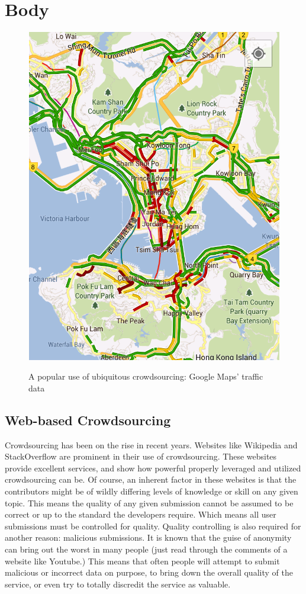 \documentclass{sig-alternate-05-2015}
\begin{document}
	\section{Body}	
	\begin{figure}
		\centering \includegraphics[width=0.7\columnwidth]{maps-traffic}
		\label{fig-traffic}
		\caption{A popular use of ubiquitous crowdsourcing: Google Maps' traffic data}
	\end{figure}
	\subsection{Web-based Crowdsourcing}
	
	Crowdsourcing has been on the rise in recent years. Websites like Wikipedia and StackOverflow are prominent in their use of crowdsourcing. These websites provide excellent services, and show how powerful properly leveraged and utilized crowdsourcing can be. Of course, an inherent factor in these websites is that the contributors might be of wildly differing levels of knowledge or skill on any given topic. This means the quality of any given submission cannot be assumed to be correct or up to the standard the developers require. Which means all user submissions must be controlled for quality. Quality controlling is also required for another reason: malicious submissions. It is known that the guise of anonymity can bring out the worst in many people (just read through the comments of a website like Youtube.) This means that often people will attempt to submit malicious or incorrect data on purpose, to bring down the overall quality of the service, or even try to totally discredit the service as valuable.
	
\end{document}

